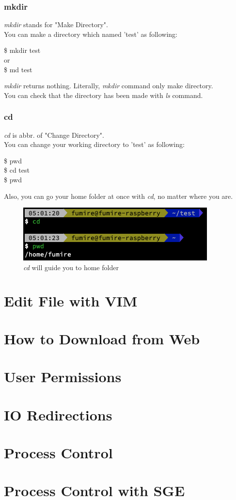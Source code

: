 \documentclass{beamer}
\begin{document}
	\begin{frame}
		\frametitle{mkdir}
		\textit{mkdir} stands for "Make Directory". \\
		You can make a directory which named 'test' as following: 
		\begin{example}
			\$ mkdir test \\
			or \\
			\$ md test \\
		\end{example}
		\textit{mkdir} returns nothing. Literally, \textit{mkdir} command only make directory. \\
		You can check that the directory has been made with \textit{ls} command. 
	\end{frame}

	\begin{frame}
		\frametitle{cd}
		\textit{cd} is abbr. of "Change Directory". \\
		You can change your working directory to 'test' as following:
		\begin{example}
			\$ pwd \\
			\$ cd test\\
			\$ pwd \\
		\end{example}
	
		Also, you can go your home folder at once with \textit{cd}, no matter where you are.
		\begin{figure}[h!]
			\centering
			\includegraphics[width=0.7 \linewidth]{figures/6.png}
			\caption{\textit{cd} will guide you to home folder}
		\end{figure}
	\end{frame}
	
	\section{Edit File with VIM}
	
	\section{How to Download from Web}
	
	\section{User Permissions}
	
	\section{IO Redirections}
	
	\section{Process Control}
	
	\section{Process Control with SGE}
\end{document}

